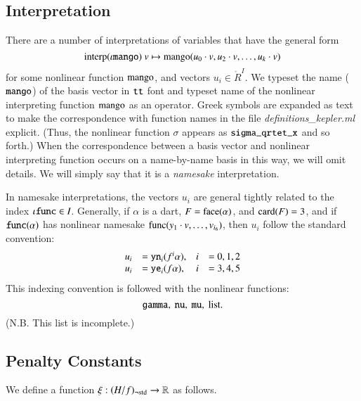 \subsection{Interpretation}

There are a number of interpretations of variables that have the
general form
    $${\operatorname{interp}}(\iota{\operatorname{{\texttt{mango}}}})\ v\mapsto
    {\operatorname{mango}}(u_0\cdot v,u_2\cdot v,\ldots,u_k\cdot v)$$
for some nonlinear function ${\operatorname{mango}}$, and vectors $u_i\in
\ring{R}^I$.  We typeset the name (${\operatorname{{\texttt{mango}}}}$) of the basis
vector in ${\operatorname{{\texttt{tt}}}}$ font and typeset name of the nonlinear
interpreting function ${\operatorname{mango}}$ as an operator. Greek symbols
are expanded as text to make the correspondence with function
names in the file
    {\it definitions\_kepler.ml} explicit. (Thus, the nonlinear
    function $\sigma$ appears
    as ${\operatorname{{\texttt{sigma\_qrtet\_x}}}}$ and so forth.)
When the correspondence between a basis vector and nonlinear
interpreting function occurs on a name-by-name basis in this way,
we will omit details.  We will simply say that it is a {\it
namesake} interpretation.

In namesake interpretations, the vectors $u_i$ are general tightly
related to the index $\iota{\operatorname{{\texttt{func}}}}\in I$.  Generally, if
$\alpha$ is a dart, $F={\operatorname{face}}(\alpha)$,  and ${\operatorname{card}}(F)=3$, and
if ${\operatorname{{\texttt{func}}}}(\alpha)$ has nonlinear namesake
${\operatorname{func}}(y_1\cdot v,\ldots,v_{i_6})$, then $u_i$ follow the
standard convention:
    $$
    \begin{array}{llll}
    u_i &= {\operatorname{{\texttt{yn}}}}_i(f^i\alpha), &i &=0,1,2\\
    u_i &= {\operatorname{{\texttt{ye}}}}_i(f\alpha), &i &=3,4,5
    \end{array}
    $$
This indexing convention is followed with the nonlinear functions:
    $$
    {\operatorname{{\texttt{gamma}}}},\ {\operatorname{{\texttt{nu}}}},\ {\operatorname{{\texttt{mu}}}},\ \text{list.}
    $$
(N.B. This list is incomplete.) %


\subsection{Penalty Constants}
\label{sec:pc}


We define a function $\xi:(H/f)_{\neg{\operatorname{std}}}\to\mathbb{R}$ as
follows.


